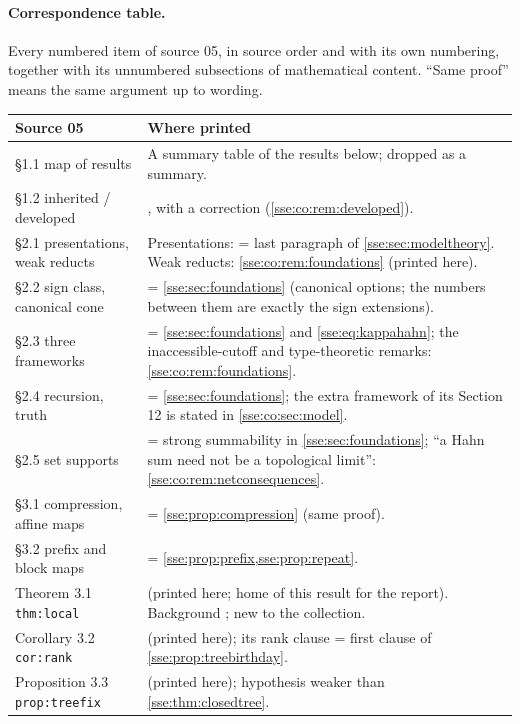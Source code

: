 \documentclass[11pt,a4paper]{article}
\numberwithin{equation}{section}
\theoremstyle{plain}
\theoremstyle{definition}
\theoremstyle{remark}
\newcommand{\fn}[1]{\nolinkurl{#1}}%
\begin{document}
\paragraph{Correspondence table.} Every numbered item of source 05, in
source order and with its own numbering, together with its unnumbered
subsections of mathematical content. ``Same proof'' means the same argument
up to wording.

\begingroup\small
\begin{longtable}{P{34mm}P{116mm}}
\toprule
Source 05 & Where printed \\
\midrule
\endhead
\S1.1 map of results & A summary table of the results below; dropped as a summary. \\
\S1.2 inherited / developed & , with a correction (\cref{sse:co:rem:developed}). \\
\S2.1 presentations, weak reducts & Presentations: = last paragraph of \cref{sse:sec:modeltheory}. Weak reducts: \cref{sse:co:rem:foundations} (printed here). \\
\S2.2 sign class, canonical cone & = \cref{sse:sec:foundations} (canonical options; the numbers between them are exactly the sign extensions). \\
\S2.3 three frameworks & = \cref{sse:sec:foundations} and \eqref{sse:eq:kappahahn}; the inaccessible-cutoff and type-theoretic remarks: \cref{sse:co:rem:foundations}. \\
\S2.4 recursion, truth & = \cref{sse:sec:foundations}; the extra framework of its Section 12 is stated in \cref{sse:co:sec:model}. \\
\S2.5 set supports & = strong summability in \cref{sse:sec:foundations}; ``a Hahn sum need not be a topological limit'': \cref{sse:co:rem:netconsequences}. \\
\S3.1 compression, affine maps & = \cref{sse:prop:compression} (same proof). \\
\S3.2 prefix and block maps & = \cref{sse:prop:prefix,sse:prop:repeat}. \\
Theorem 3.1 \fn{thm:local} &  (printed here; home of this result for the report). Background \cite{BVH}; new to the collection. \\
Corollary 3.2 \fn{cor:rank} &  (printed here); its rank clause = first clause of \cref{sse:prop:treebirthday}. \\
Proposition 3.3 \fn{prop:treefix} &  (printed here); hypothesis weaker than \cref{sse:thm:closedtree}. \\

\end{longtable}
\end{document}
